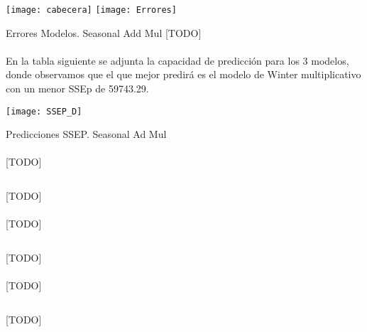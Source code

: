 \documentclass[a4paper, spanish]{article}
\begin{document}
    \begin{table}[htb!]
      \centering
      \texttt{[image: cabecera]}
      \texttt{[image: Errores]}
      \caption{Errores Modelos. Seasonal Add Mul [TODO]}
      \label{}
    \end{table}

    \paragraph{}
    En la tabla siguiente se adjunta la capacidad de predicción para los 3 modelos, donde observamos que el que mejor predirá
    es el modelo de Winter multiplicativo con un menor SSEp de 59743.29.

    \begin{table}[htb!]
      \centering
      \texttt{[image: SSEP\_D]}
      \caption{Predicciones SSEP. Seasonal Ad Mul}
      \label{}
    \end{table}

    \paragraph{}
    [TODO]

    \begin{listing}[htb!]
      \centering
      \inputminted{SAS}{./res/code/d-01-cross-validation.sas}
      \caption{[TODO]}
      \label{code:d_cross_validation}
    \end{listing}

    \paragraph{}
    [TODO]

    \begin{listing}[htb!]
      \centering
      \inputminted{SAS}{./res/code/d-02-prediction-error-esm-seasonal.sas}
      \caption{[TODO]}
      \label{code:d_prediction_error_esm_seasonal}
    \end{listing}

    \paragraph{}
    [TODO]

    \begin{listing}[htb!]
      \centering
      \inputminted{SAS}{./res/code/d-02-prediction-error-esm-winteradd.sas}
      \caption{[TODO]}
      \label{code:d_prediction_error_esm_winteradd}
    \end{listing}
\end{document}
